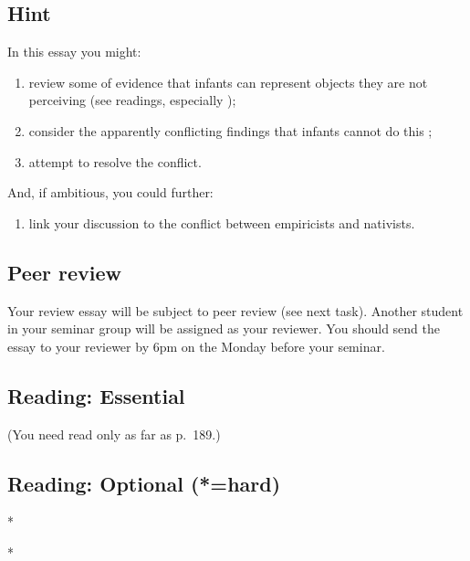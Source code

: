 \documentclass[12pt,\papersize]{extarticle}
\begin{document}
\subsection{Hint}
In this essay you might:
\begin{enumerate}
\item review some of evidence that infants can represent objects they are not perceiving (see readings, especially \citealp{baillargeon:1987_object});
\item consider the apparently conflicting findings that infants cannot do this \citep{Shinskey:2001fk};
\item attempt to resolve the conflict.
\end{enumerate}
%
And, if ambitious, you could further:
%
\begin{enumerate}[resume]
\item link your discussion to the conflict between empiricists  and nativists.
\end{enumerate}


\subsection{Peer review}
Your review essay will be subject to peer review (see next task). 
Another student in your seminar group will be assigned as your reviewer.
You should send the essay to your reviewer by 6pm on the Monday before your seminar.



\subsection{Reading: Essential}




  (You need read only as far as p.\ 189.)



\subsection{Reading: Optional (*=hard)}


*


*
\end{document}
